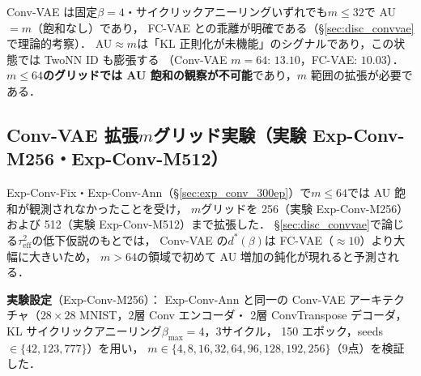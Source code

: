 \documentclass[11pt,a4paper]{jsarticle}
\begin{document}
Conv-VAE は固定$\beta=4$・サイクリックアニーリングいずれでも$m \leq 32$で AU$=m$（飽和なし）であり，
FC-VAE との乖離が明確である（§\ref{sec:disc_convvae}で理論的考察）．
AU$\approx m$は「KL 正則化が未機能」のシグナルであり，この状態では TwoNN ID も膨張する
（Conv-VAE $m=64$: $13.10$，FC-VAE: $10.03$）．
\textbf{$m \leq 64$のグリッドでは AU 飽和の観察が不可能}であり，$m$ 範囲の拡張が必要である．

\subsection{Conv-VAE 拡張$m$グリッド実験（実験 Exp-Conv-M256・Exp-Conv-M512）}\label{sec:exp_en}

Exp-Conv-Fix・Exp-Conv-Ann（§\ref{sec:exp_conv_300ep}）で$m \leq 64$では AU 飽和が観測されなかったことを受け，
$m$グリッドを 256（実験 Exp-Conv-M256）および 512（実験 Exp-Conv-M512）まで拡張した．
§\ref{sec:disc_convvae}で論じる$\tau^2_\mathrm{eff}$の低下仮説のもとでは，
Conv-VAE の$d^*(\beta)$は FC-VAE（$\approx 10$）より大幅に大きいため，
$m>64$の領域で初めて AU 増加の鈍化が現れると予測される．

\textbf{実験設定}（Exp-Conv-M256）：
Exp-Conv-Ann と同一の Conv-VAE アーキテクチャ（$28\times28$ MNIST，2層 Conv エンコーダ・
2層 ConvTranspose デコーダ，KL サイクリックアニーリング$\beta_\mathrm{max}=4$，3サイクル，
150 エポック，seeds$\in\{42,123,777\}$）を用い，
$m \in \{4, 8, 16, 32, 64, 96, 128, 192, 256\}$（9点）を検証した．
\end{document}
